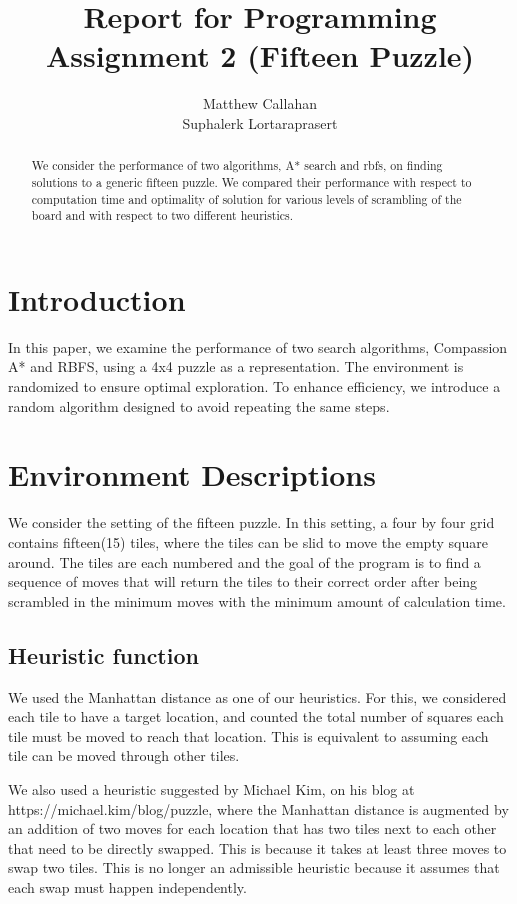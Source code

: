 \documentclass{article}
\title{Report for Programming Assignment 2 (Fifteen Puzzle)}
\author{%
  Matthew Callahan\\
  \And
  Suphalerk Lortaraprasert
}
\begin{document}
\maketitle


\begin{abstract}
 We consider the performance of two algorithms, A* search and rbfs, on finding solutions to a generic fifteen puzzle. We compared their performance with respect to computation time and optimality of solution for various levels of scrambling of the board and with respect to two different heuristics. 
\end{abstract}

\section{Introduction}

In this paper, we examine the performance of two search algorithms, Compassion A* and RBFS, using a 4x4 puzzle as a representation. The environment is randomized to ensure optimal exploration. To enhance efficiency, we introduce a random algorithm designed to avoid repeating the same steps.

\section{Environment Descriptions}
We consider the setting of the fifteen puzzle. In this setting, a four by four grid contains fifteen(15) tiles, where the tiles can be slid to move the empty square around. The tiles are each numbered and the goal of the program is to find a sequence of moves that will return the tiles to their correct order after being scrambled in the minimum moves with the minimum amount of calculation time. 

\subsection{Heuristic function}
We used the Manhattan distance as one of our heuristics. For this, we considered each tile to have a target location, and counted the total number of squares each tile must be moved to reach that location. This is equivalent to assuming each tile can be moved through other tiles.

We also used a heuristic suggested by Michael Kim, on his blog at https://michael.kim/blog/puzzle, where the Manhattan distance is augmented by an addition of two moves for each location that has two tiles next to each other that need to be directly swapped. This is because it takes at least three moves to swap two tiles. This is no longer an admissible heuristic because it assumes that each swap must happen independently. 
\end{document}
